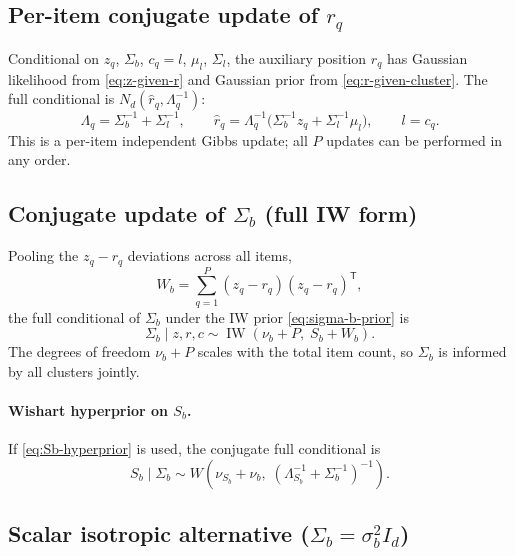 \documentclass[11pt]{article}
\newcommand{\trans}{^{\mathsf T}}
\DeclareMathOperator{\IW}{IW}
\begin{document}
\subsection{Per-item conjugate update of $r_q$}

Conditional on $z_q$, $\Sigma_b$, $c_q=l$, $\mu_l$, $\Sigma_l$, the auxiliary
position $r_q$ has Gaussian likelihood from \eqref{eq:z-given-r} and Gaussian
prior from \eqref{eq:r-given-cluster}.  The full conditional is
$N_d(\widehat r_q,\Lambda_q^{-1})$:
\begin{equation}
    \Lambda_q
    =
    \Sigma_b^{-1}+\Sigma_{l}^{-1},
    \qquad
    \widehat r_q
    =
    \Lambda_q^{-1}\bigl(\Sigma_b^{-1}z_q+\Sigma_{l}^{-1}\mu_l\bigr),
    \qquad l=c_q.
    \label{eq:r-update}
\end{equation}
This is a per-item independent Gibbs update; all $P$ updates can be performed
in any order.

\subsection{Conjugate update of $\Sigma_b$ (full IW form)}

Pooling the $z_q-r_q$ deviations across all items,
\begin{equation}
    W_b=\sum_{q=1}^{P}(z_q-r_q)(z_q-r_q)\trans,
    \label{eq:Wb}
\end{equation}
the full conditional of $\Sigma_b$ under the IW prior \eqref{eq:sigma-b-prior}
is
\begin{equation}
    \Sigma_b\mid z,r,c\sim\IW(\nu_b+P,\;S_b+W_b).
    \label{eq:sigma-b-update}
\end{equation}
The degrees of freedom $\nu_b+P$ scales with the total item count, so
$\Sigma_b$ is informed by all clusters jointly.

\paragraph{Wishart hyperprior on $S_b$.}
If \eqref{eq:Sb-hyperprior} is used, the conjugate full conditional is
\begin{equation}
    S_b\mid\Sigma_b
    \sim
    W\!\left(\nu_{S_b}+\nu_b,\;
    (\Lambda_{S_b}^{-1}+\Sigma_b^{-1})^{-1}\right).
    \label{eq:Sb-update}
\end{equation}

\subsection{Scalar isotropic alternative ($\Sigma_b=\sigma_b^2 I_d$)}
\end{document}
